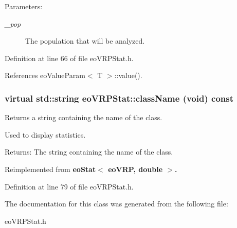 \begin{Desc}
\item[Parameters:]
\begin{description}
\item[{\em \_\-pop}]The population that will be analyzed. \end{description}
\end{Desc}


Definition at line 66 of file eo\-VRPStat.h.

References eo\-Value\-Param$<$ T $>$::value().
\subsubsection{\setlength{\rightskip}{0pt plus 5cm}virtual std::string eo\-VRPStat::class\-Name (void) const\hspace{0.3cm}{\tt  [inline, virtual]}}\label{classeo_v_r_p_stat_61d9ece1bde19f4cd997c3aba075d8e7}


Returns a string containing the name of the class. 

Used to display statistics. \begin{Desc}
\item[Returns:]The string containing the name of the class. \end{Desc}


Reimplemented from \bf{eo\-Stat$<$ eo\-VRP, double $>$}.

Definition at line 79 of file eo\-VRPStat.h.

The documentation for this class was generated from the following file:\begin{CompactItemize}
\item 
eo\-VRPStat.h\end{CompactItemize}
